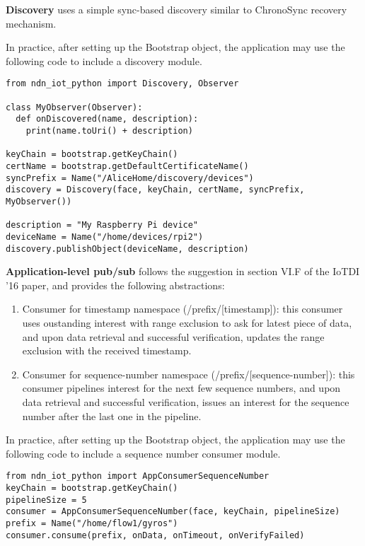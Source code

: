 \textbf{Discovery} uses a simple sync-based discovery similar to ChronoSync recovery mechanism.

In practice, after setting up the Bootstrap object, the application may use the following code to include a discovery module.
\begin{verbatim}
from ndn_iot_python import Discovery, Observer

class MyObserver(Observer):
  def onDiscovered(name, description):
    print(name.toUri() + description)

keyChain = bootstrap.getKeyChain()
certName = bootstrap.getDefaultCertificateName()
syncPrefix = Name("/AliceHome/discovery/devices")
discovery = Discovery(face, keyChain, certName, syncPrefix, MyObserver())

description = "My Raspberry Pi device"
deviceName = Name("/home/devices/rpi2")
discovery.publishObject(deviceName, description)
\end{verbatim}

\textbf{Application-level pub/sub} follows the suggestion in section VI.F of the IoTDI '16 paper, and provides the following abstractions:
\begin{enumerate}
\item Consumer for timestamp namespace (/prefix/[timestamp]): this consumer uses oustanding interest with range exclusion to ask for latest piece of data, and upon data retrieval and successful verification, updates the range exclusion with the received timestamp.
\item Consumer for sequence-number namespace (/prefix/[sequence-number]): this consumer pipelines interest for the next few sequence numbers, and upon data retrieval and successful verification, issues an interest for the sequence number after the last one in the pipeline.
\end{enumerate}

In practice, after setting up the Bootstrap object, the application may use the following code to include a sequence number consumer module.

\begin{verbatim}
from ndn_iot_python import AppConsumerSequenceNumber
keyChain = bootstrap.getKeyChain()
pipelineSize = 5
consumer = AppConsumerSequenceNumber(face, keyChain, pipelineSize)
prefix = Name("/home/flow1/gyros")
consumer.consume(prefix, onData, onTimeout, onVerifyFailed)
\end{verbatim}


